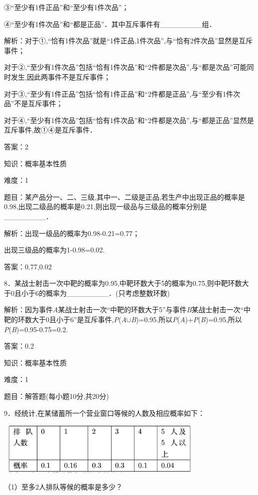 \documentclass{article} %
\begin{document}
③``至少有1件正品''和``至少有1件次品''；

④``至少有1件次品''和``都是正品''．其中互斥事件有\_\_\_\_\_\_\_\_组．

解析：对于①,``恰有1件次品''就是``1件正品,1件次品'',与``恰有2件次品''显然是互斥事件；

对于②,``至少有1件次品''包括``恰有1件次品''和``2件都是次品'',与``都是次品''可能同时发生,因此两事件不是互斥事件；

对于③,``至少有1件正品''包括``恰有1件正品''和``2件都是正品'',与``至少有1件次品''不是互斥事件；

对于④,``至少有1件次品''包括``恰有1件次品''和``2件都是次品'',与``都是正品''显然是互斥事件,故①④是互斥事件．

答案：2

知识：概率基本性质

难度：1

题目：某产品分一、二、三级,其中一、二级是正品,若生产中出现正品的概率是0.98,出现二级品的概率是0.21,则出现一级品与三级品的概率分别是\_\_\_\_\_\_\_\_．

解析：出现一级品的概率为0.98-0.21=0.77；

出现三级品的概率为1-0.98=0.02.

答案：0.77,0.02

8．某战士射击一次中靶的概率为0.95,中靶环数大于5的概率为0.75,则中靶环数大于0且小于6的概率为\_\_\_\_\_\_\_\_．(只考虑整数环数)

解析：因为事件\textit{A}某战士射击一次``中靶的环数大于5''与事件\textit{B}某战士射击一次``中靶的环数大于0且小于6''是互斥事件,\textit{P}(\textit{A}$\mathrm{\cup}$\textit{B})=0.95.所以\textit{P}(\textit{A})+\textit{P}(\textit{B})=0.95,所以\textit{P}(\textit{B})=0.95-0.75=0.2.

答案：0.2

知识：概率基本性质

难度：1

题目：解答题(每小题10分,共20分)

9．经统计,在某储蓄所一个营业窗口等候的人数及相应概率如下：

\includegraphics*[width=4in, height=1in, keepaspectratio=false]{image124}

（1）至多2人排队等候的概率是多少？
\end{document}
